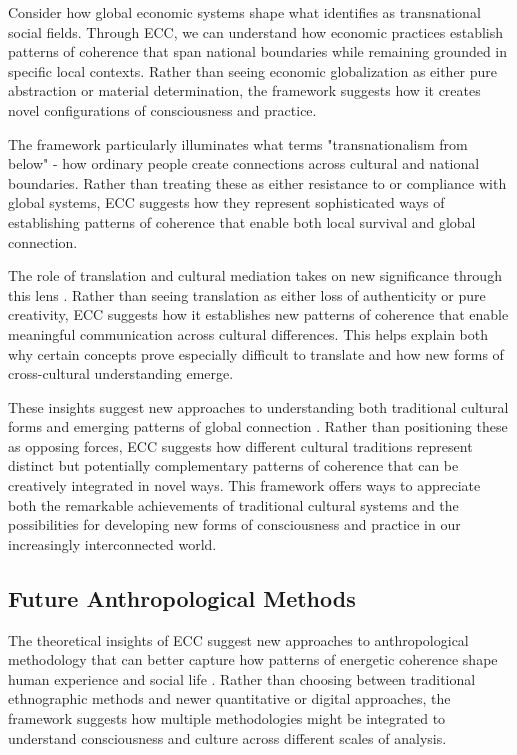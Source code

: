 \begin{refsection}
Consider how global economic systems shape what \cite{sassen2007sociology} identifies as transnational social fields. Through ECC, we can understand how economic practices establish patterns of coherence that span national boundaries while remaining grounded in specific local contexts. Rather than seeing economic globalization as either pure abstraction or material determination, the framework suggests how it creates novel configurations of consciousness and practice.

The framework particularly illuminates what \cite{vertovec2009transnationalism} terms "transnationalism from below" - how ordinary people create connections across cultural and national boundaries. Rather than treating these as either resistance to or compliance with global systems, ECC suggests how they represent sophisticated ways of establishing patterns of coherence that enable both local survival and global connection.

The role of translation and cultural mediation takes on new significance through this lens \cite{tomlinson1999globalization}. Rather than seeing translation as either loss of authenticity or pure creativity, ECC suggests how it establishes new patterns of coherence that enable meaningful communication across cultural differences. This helps explain both why certain concepts prove especially difficult to translate and how new forms of cross-cultural understanding emerge.

These insights suggest new approaches to understanding both traditional cultural forms and emerging patterns of global connection \cite{appadurai1996modernity}. Rather than positioning these as opposing forces, ECC suggests how different cultural traditions represent distinct but potentially complementary patterns of coherence that can be creatively integrated in novel ways. This framework offers ways to appreciate both the remarkable achievements of traditional cultural systems and the possibilities for developing new forms of consciousness and practice in our increasingly interconnected world.

\subsection{Future Anthropological Methods}

The theoretical insights of ECC suggest new approaches to anthropological methodology that can better capture how patterns of energetic coherence shape human experience and social life \cite{rabinow2011accompaniment}. Rather than choosing between traditional ethnographic methods and newer quantitative or digital approaches, the framework suggests how multiple methodologies might be integrated to understand consciousness and culture across different scales of analysis.


\end{refsection}
